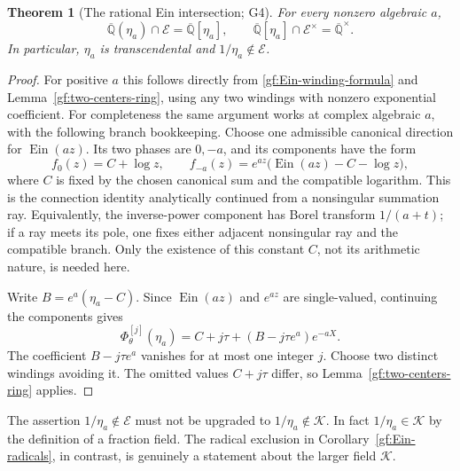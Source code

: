 \documentclass[11pt,a4paper]{article}
\numberwithin{equation}{section}
\newtheorem{theorem}{Theorem}[section]
\theoremstyle{definition}
\theoremstyle{remark}
\newcommand{\A}{\overline{\mathbb Q}}
\newcommand{\Er}{\mathcal E}
\newcommand{\K}{\mathcal K}
\newcommand{\Ein}{\operatorname{Ein}}
\begin{document}
\begin{theorem}[The rational Ein intersection; G4]\label{gf:einintersection}
For every nonzero algebraic $a$,
\begin{equation}\label{gf:einintersection-equation}
 \A(\eta_a)\cap\Er=\A[\eta_a],\qquad
 \A[\eta_a]\cap\Er^\times=\A^\times.
\end{equation}
In particular, $\eta_a$ is transcendental and
$1/\eta_a\notin\Er$.
\end{theorem}
\begin{proof}
For positive $a$ this follows directly from
\eqref{gf:Ein-winding-formula} and Lemma~\ref{gf:two-centers-ring},
using any two windings with nonzero exponential coefficient.
For completeness the same argument works at complex algebraic $a$,
with the following branch bookkeeping.  Choose one admissible
canonical direction for $\Ein(az)$.  Its two phases are $0,-a$, and
its components have the form
\[
 f_0(z)=C+\log z,\qquad
 f_{-a}(z)=e^{az}\bigl(\Ein(az)-C-\log z\bigr),
\]
where $C$ is fixed by the chosen canonical sum and the compatible
logarithm.  This is the connection identity analytically continued
from a nonsingular summation ray.  Equivalently, the inverse-power
component has Borel transform $1/(a+t)$; if a ray meets its pole,
one fixes either adjacent nonsingular ray and the compatible branch.
Only the existence of this constant $C$, not its arithmetic nature,
is needed here.

Write $B=e^a(\eta_a-C)$.  Since $\Ein(az)$ and $e^{az}$ are
single-valued, continuing the components gives
\[
 \Phi_\theta^{[j]}(\eta_a)
    =C+j\tau+(B-j\tau e^a)e^{-aX}.
\]
The coefficient $B-j\tau e^a$ vanishes for at most one integer $j$.
Choose two distinct windings avoiding it.  The omitted values
$C+j\tau$ differ, so Lemma~\ref{gf:two-centers-ring} applies.
\end{proof}

The assertion $1/\eta_a\notin\Er$ must not be upgraded to
$1/\eta_a\notin\K$.  In fact $1/\eta_a\in\K$ by the definition of
a fraction field.  The radical exclusion in
Corollary~\ref{gf:Ein-radicals}, in contrast, is genuinely a statement
about the larger field $\K$.
\end{document}
